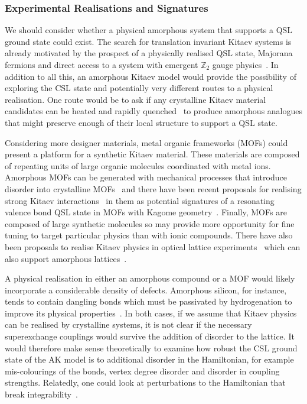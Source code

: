 \hypertarget{experimental-realisations-and-signatures}{%
\subsubsection{Experimental Realisations and Signatures}\label{experimental-realisations-and-signatures}}

We should consider whether a physical amorphous system that supports a QSL ground state could exist. The search for translation invariant Kitaev systems is already motivated by the prospect of a physically realised QSL state, Majorana fermions and direct access to a system with emergent \(\mathbb{Z}_2\) gauge physics~\autocite{TrebstPhysRep2022}. In addition to all this, an amorphous Kitaev model would provide the possibility of exploring the CSL state and potentially very different routes to a physical realisation. One route would be to ask if any crystalline Kitaev material candidates can be heated and rapidly quenched~\autocite{Weaire1976,Petrakovski1981,Kaneyoshi2018} to produce amorphous analogues that might preserve enough of their local structure to support a QSL state.

Considering more designer materials, metal organic frameworks (MOFs) could present a platform for a synthetic Kitaev material. These materials are composed of repeating units of large organic molecules coordinated with metal ions. Amorphous MOFs can be generated with mechanical processes that introduce disorder into crystalline MOFs~\autocite{bennett2014amorphous} and there have been recent proposals for realising strong Kitaev interactions~\autocite{yamadaDesigningKitaevSpin2017} in them as potential signatures of a resonating valence bond QSL state in MOFs with Kagome geometry~\autocite{misumiQuantumSpinLiquid2020}. Finally, MOFs are composed of large synthetic molecules so may provide more opportunity for fine tuning to target particular physics than with ionic compounds. There have also been proposals to realise Kitaev physics in optical lattice experiments~\autocite{duanControllingSpinExchange2003,micheliToolboxLatticespinModels2006} which can also support amorphous lattices~\autocite{sadeghiAmorphousTwodimensionalOptical2005}.

A physical realisation in either an amorphous compound or a MOF would likely incorporate a considerable density of defects. Amorphous silicon, for instance, tends to contain dangling bonds which must be passivated by hydrogenation to improve its physical properties~\autocite{streetHydrogenatedAmorphousSilicon1991}. In both cases, if we assume that Kitaev physics can be realised by crystalline systems, it is not clear if the necessary superexchange couplings would survive the addition of disorder to the lattice. It would therefore make sense theoretically to examine how robust the CSL ground state of the AK model is to additional disorder in the Hamiltonian, for example mis-colourings of the bonds, vertex degree disorder and disorder in coupling strengths. Relatedly, one could look at perturbations to the Hamiltonian that break integrability~\autocite{Rau2014,Chaloupka2010,Chaloupka2013,Chaloupka2015,Winter2016}.

